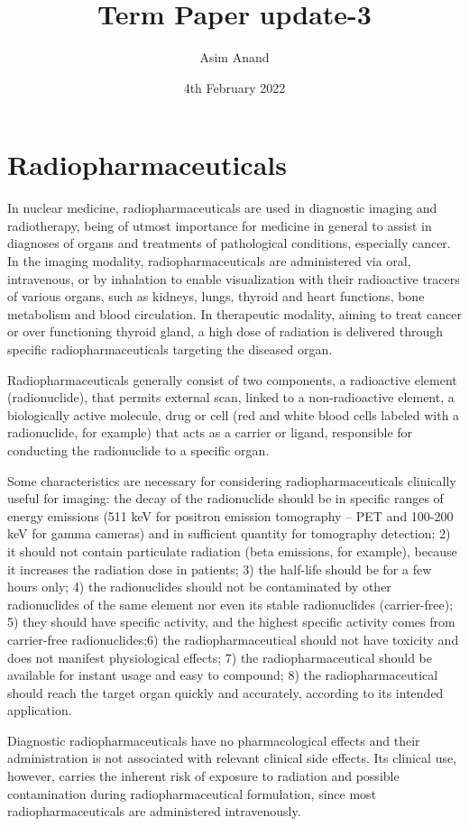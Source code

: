 \documentclass{article}
\title{Term Paper update-3}
\author{Asim Anand}
\date{4th February 2022}
\begin{document}
\maketitle

\section{Radiopharmaceuticals}
In nuclear medicine, radiopharmaceuticals are used in diagnostic imaging and radiotherapy, being of  utmost importance for  medicine in general to assist  in  diagnoses  of  organs  and  treatments  of pathological conditions, especially cancer.  In the imaging  modality,  radiopharmaceuticals  are administered via oral, intravenous, or by inhalation to  enable  visualization  with  their  radioactive tracers of various organs, such as kidneys, lungs, thyroid and heart functions, bone metabolism and blood circulation. In therapeutic modality, aiming to treat cancer or over functioning thyroid gland, a high dose of radiation is delivered through specific radiopharmaceuticals  targeting  the  diseased organ.

Radiopharmaceuticals generally consist of two components, a radioactive element (radionuclide), that  permits  external  scan,  linked  to  a  non-radioactive  element,  a  biologically  active molecule, drug or cell (red and white blood cells labeled with a radionuclide, for example) that acts as a carrier or ligand, responsible for conducting the radionuclide to a specific organ.

Some  characteristics  are  necessary  for considering radiopharmaceuticals clinically useful for imaging: the decay of the radionuclide should be in specific ranges of energy emissions (511 keV for positron emission tomography – PET and 100-200  keV  for  gamma  cameras)  and  in  sufficient quantity for tomography detection; 2) it should not contain  particulate  radiation  (beta emissions,  for example), because it increases the radiation dose in patients; 3) the half-life should be for a few hours only;  4)  the  radionuclides  should  not  be contaminated by other radionuclides of the same element nor even its stable radionuclides (carrier-free); 5) they should have specific activity, and the highest  specific activity  comes  from carrier-free radionuclides;6)  the radiopharmaceutical  should not  have  toxicity  and  does  not  manifest physiological effects;  7) the  radiopharmaceutical should be available for instant usage and easy to compound;  8)  the  radiopharmaceutical  should reach  the  target  organ  quickly  and  accurately, according to its intended application. 

Diagnostic  radiopharmaceuticals  have  no pharmacological effects and their administration is not associated with relevant clinical side effects. Its clinical use, however, carries the inherent risk of exposure to radiation and possible contamination during  radiopharmaceutical  formulation,  since most  radiopharmaceuticals  are  administered intravenously.
\end{document}
